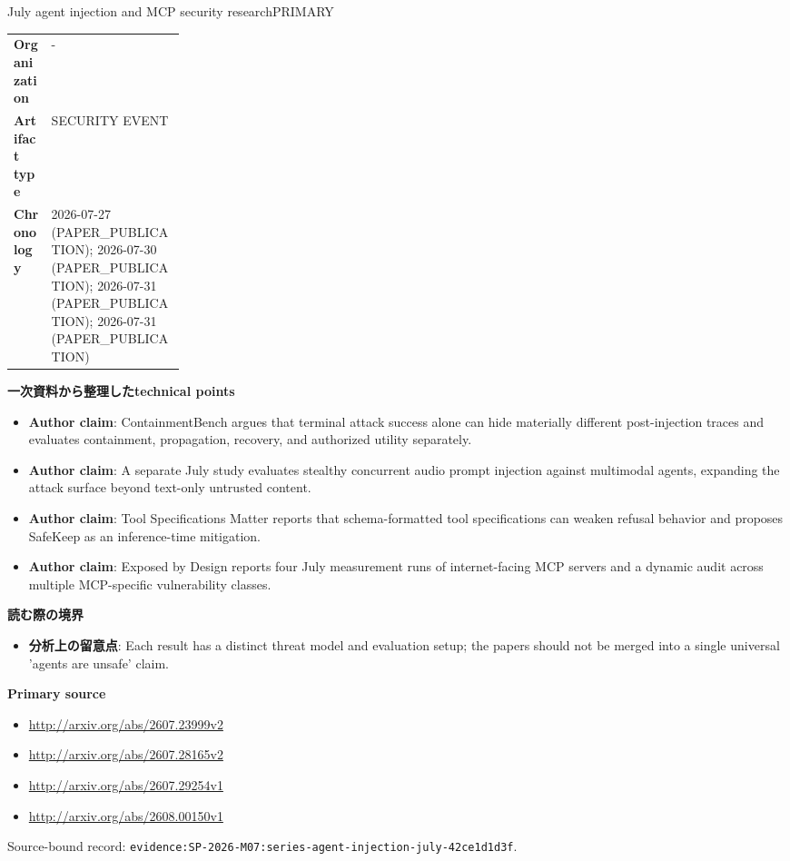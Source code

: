 \begin{technicalnote}{July agent injection and MCP security research}{PRIMARY}
\begin{tabularx}{\linewidth}{@{}>{\bfseries}p{0.22\linewidth}X@{}}
Organization & - \\
Artifact type & SECURITY EVENT \\
Chronology & 2026-07-27 (PAPER\_PUBLICATION); 2026-07-30 (PAPER\_PUBLICATION); 2026-07-31 (PAPER\_PUBLICATION); 2026-07-31 (PAPER\_PUBLICATION) \\
\end{tabularx}
\smallskip
{\bfseries 一次資料から整理したtechnical points}
\begin{itemize}[leftmargin=1.5em,itemsep=0.35em]
\item \textbf{Author claim}: ContainmentBench argues that terminal attack success alone can hide materially different post-injection traces and evaluates containment, propagation, recovery, and authorized utility separately.
\item \textbf{Author claim}: A separate July study evaluates stealthy concurrent audio prompt injection against multimodal agents, expanding the attack surface beyond text-only untrusted content.
\item \textbf{Author claim}: Tool Specifications Matter reports that schema-formatted tool specifications can weaken refusal behavior and proposes SafeKeep as an inference-time mitigation.
\item \textbf{Author claim}: Exposed by Design reports four July measurement runs of internet-facing MCP servers and a dynamic audit across multiple MCP-specific vulnerability classes.
\end{itemize}
{\bfseries 読む際の境界}
\begin{itemize}[leftmargin=1.5em,itemsep=0.35em]
\item \textbf{分析上の留意点}: Each result has a distinct threat model and evaluation setup; the papers should not be merged into a single universal 'agents are unsafe' claim.
\end{itemize}
{\bfseries Primary source}
\begingroup\sloppy
\begin{itemize}[leftmargin=1.5em,itemsep=0.25em]
\item {\scriptsize\url{http://arxiv.org/abs/2607.23999v2}}
\item {\scriptsize\url{http://arxiv.org/abs/2607.28165v2}}
\item {\scriptsize\url{http://arxiv.org/abs/2607.29254v1}}
\item {\scriptsize\url{http://arxiv.org/abs/2608.00150v1}}
\end{itemize}
\endgroup
{\scriptsize\color{SurveyMuted}Source-bound record: \texttt{evidence:SP-2026-M07:series-agent-injection-july-42ce1d1d3f}.}
\end{technicalnote}
\medskip

